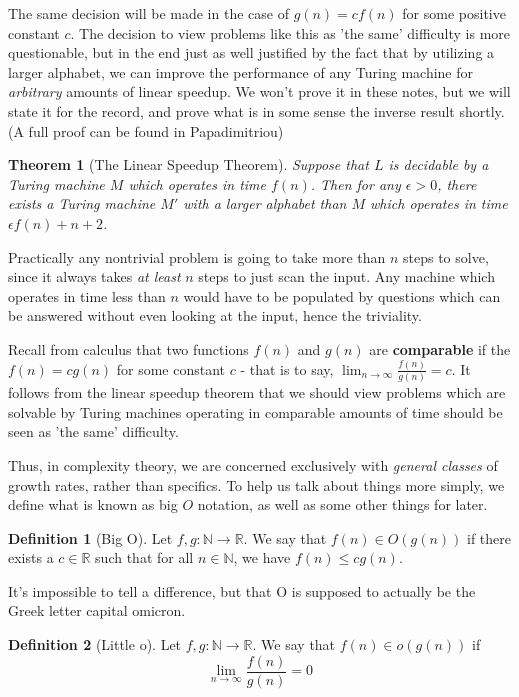 \documentclass{article}
\theoremstyle{definition}
\newtheorem{definition}{Definition}[section]
\theoremstyle{plain}
\theoremstyle{theorem}
\newtheorem{theorem}{Theorem}[section]
\begin{document}
\par The same decision will be made in the case of $g(n) = cf(n)$ for some positive constant $c$. The decision to view problems like this as 'the same' difficulty is more questionable, but in the end just as well justified by the fact that by utilizing a larger alphabet, we can improve the performance of any Turing machine for \textit{arbitrary} amounts of linear speedup. We won't prove it in these notes, but we will state it for the record, and prove what is in some sense the inverse result shortly. (A full proof can be found in Papadimitriou)
\begin{theorem}[The Linear Speedup Theorem]
	Suppose that $L$ is decidable by a Turing machine $M$ which operates in time $f(n)$. Then for any $\epsilon > 0$, there exists a Turing machine $M'$ with a larger alphabet than $M$ which operates in time $\epsilon f(n)+n+2$.
\end{theorem}
Practically any nontrivial problem is going to take more than $n$ steps to solve, since it always takes \textit{at least} $n$ steps to just scan the input. Any machine which operates in time less than $n$ would have to be populated by questions which can be answered without even looking at the input, hence the triviality. \par 
Recall from calculus that two functions $f(n)$ and $g(n)$ are \textbf{comparable} if  the $f(n) = cg(n)$ for some constant $c$ - that is to say, $\lim_{n \to \infty} \frac{f(n)}{g(n)} = c$. It follows from the linear speedup theorem that we should view problems which are solvable by Turing machines operating in comparable amounts of time should be seen as 'the same' difficulty. \par 
Thus, in complexity theory, we are concerned exclusively with \textit{general classes} of growth rates, rather than specifics. To help us talk about things more simply, we define what is known as big $O$ notation, as well as some other things for later.
\begin{definition}[Big O]
Let $f,g:\mathbb{N} \to \mathbb{R}$. We say that \textbf{$f(n) \in O(g(n))$} if there exists a $c \in \mathbb{R}$ such that for all $n \in \mathbb{N}$, we have $f(n) \leq cg(n)$. 
\end{definition}
It's impossible to tell a difference, but that O is supposed to actually be the Greek letter capital omicron.
\begin{definition}[Little o]
	Let $f,g:\mathbb{N} \to \mathbb{R}$. We say that $f(n) \in o(g(n))$ if 
	\[\lim_{n \to \infty}\frac{f(n)}{g(n)} = 0 \]
\end{definition}
\end{document}
